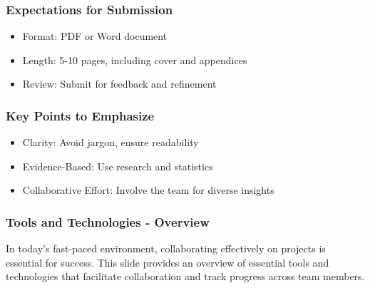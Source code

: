 \documentclass[aspectratio=169]{beamer}
\begin{document}
\begin{frame}[fragile]
    \frametitle{Expectations for Submission}
    \begin{itemize}
        \item Format: PDF or Word document
        \item Length: 5-10 pages, including cover and appendices
        \item Review: Submit for feedback and refinement
    \end{itemize}
\end{frame}

\begin{frame}[fragile]
    \frametitle{Key Points to Emphasize}
    \begin{itemize}
        \item Clarity: Avoid jargon, ensure readability
        \item Evidence-Based: Use research and statistics
        \item Collaborative Effort: Involve the team for diverse insights
    \end{itemize}
\end{frame}

\begin{frame}[fragile]
    \frametitle{Tools and Technologies - Overview}
    In today’s fast-paced environment, collaborating effectively on projects is essential for success. This slide provides an overview of essential tools and technologies that facilitate collaboration and track progress across team members.
\end{frame}
\end{document}
